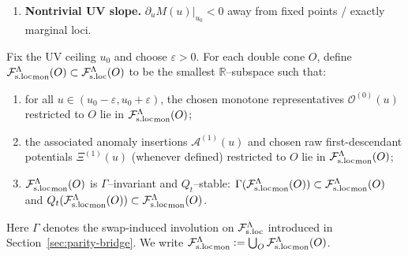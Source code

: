 \begin{definition}
\begin{enumerate}[label=\textbf{(M\arabic*)},leftmargin=*,itemsep=0.5em]
  There exist sufficiently local raw first-descendant potentials
  \(\Xi^{(1)}(u)\in\Fsloc\)
  and an anomaly insertion $\mathcal A^{(1)}(u)\in(\Fsloc)_{\bar 1}$ such that
  \begin{equation}
  \label{eq:anom-descent}
  Q_u^{\mathrm{phys}}\mathcal O^{(0)}(u)\ +\ Q_t\Xi^{(1)}(u)\ =\ \mathcal A^{(1)}(u),
  \qquad
  Q_t\mathcal A^{(1)}(u)=0.
  \end{equation}
  We interpret \eqref{eq:anom-descent} as an identity in the locality quotient
  (Definition~\ref{def:locality-quotient}); in particular, $\mathcal A^{(1)}(u)$
  represents the $Q_t$--cohomology class
  $\big[\,Q_u^{\mathrm{phys}}\mathcal O^{(0)}(u)\,\big]\in H^1(\Fsloc,Q_t)$
  (Definition~\ref{def:A1-class}).
  For SK--admissible states, $\langle Q_t X\rangle_{\rho_u}=0$ implies
  $\langle (Q_u^{\mathrm{phys}}\mathcal O^{(0)})(u)\rangle_{\rho_u}
  =\langle \mathcal A^{(1)}(u)\rangle_{\rho_u}$ and hence
  $\tfrac{d}{du}M(u)=-\langle \mathcal A^{(1)}(u)\rangle_{\rho_u}$.
  This replaces an anomaly--free descent
  $Q_u^{\mathrm{phys}}\mathcal O^{(0)}+Q_t\Xi^{(1)}=0$, which would force
  $\tfrac{d}{du}M(u)=0$ by the $Q_t$ Ward identity.
  We furthermore require that the chosen first-descendant potential at the UV ceiling
  is not a c-number on the vacuum sector (i.e.\ not constant on the connected vacuum
  component of the reduced phase space).
\item \textbf{Nontrivial UV slope.} $\partial_u M(u)\rvert_{u_0}<0$ away from fixed
  points / exactly marginal loci.
\end{enumerate}
\end{definition}

\begin{definition}
\label{def:Fsloc-mon}
Fix the UV ceiling $u_0$ and choose $\varepsilon>0$.  For each double cone $O$,
define ${\mathcal F_{\mathrm{s.loc}}^\Lambda}_{\mathrm{mon}}(O)\subset\mathcal F_{\mathrm{s.loc}}^\Lambda(O)$ to be the smallest
$\mathbb R$--subspace such that:
\begin{enumerate}[label=\textnormal{(\roman*)},leftmargin=*,itemsep=0.2em]
\item for all $u\in(u_0-\varepsilon,u_0+\varepsilon)$, the chosen monotone representatives
  $\mathcal O^{(0)}(u)$ restricted to $O$ lie in ${\mathcal F_{\mathrm{s.loc}}^\Lambda}_{\mathrm{mon}}(O)$;
\item the associated anomaly insertions $\mathcal A^{(1)}(u)$ and chosen raw first-descendant
  potentials \(\Xi^{(1)}(u)\) (whenever defined) restricted to $O$ lie in ${\mathcal F_{\mathrm{s.loc}}^\Lambda}_{\mathrm{mon}}(O)$;
\item ${\mathcal F_{\mathrm{s.loc}}^\Lambda}_{\mathrm{mon}}(O)$ is $\Gamma$--invariant and $Q_t$--stable:
  $\Gamma({\mathcal F_{\mathrm{s.loc}}^\Lambda}_{\mathrm{mon}}(O))\subset{\mathcal F_{\mathrm{s.loc}}^\Lambda}_{\mathrm{mon}}(O)$ and
  $Q_t({\mathcal F_{\mathrm{s.loc}}^\Lambda}_{\mathrm{mon}}(O))\subset{\mathcal F_{\mathrm{s.loc}}^\Lambda}_{\mathrm{mon}}(O)$.
\end{enumerate}
Here $\Gamma$ denotes the swap-induced involution on $\mathcal F_{\mathrm{s.loc}}^\Lambda$ introduced in
Section~\ref{sec:parity-bridge}.
We write ${\mathcal F_{\mathrm{s.loc}}^\Lambda}_{\mathrm{mon}}:=\bigcup_O {\mathcal F_{\mathrm{s.loc}}^\Lambda}_{\mathrm{mon}}(O)$.

\medskip
\end{definition}

